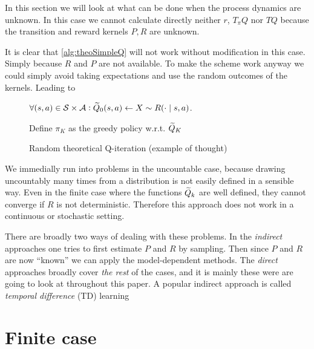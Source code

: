 
In this section we will look at what can be done when the process dynamics
are unknown.
In this case we cannot calculate directly neither $r$, $T_\pi Q$ nor
$TQ$ because the transition and reward kernels $P,R$ are unknown.

It is clear that \cref{alg:theoSimpleQ} will not work without
modification in this case. Simply because $R$ and $P$ are not
available.
To make the scheme work anyway we could simply avoid taking expectations
and use the random outcomes of the kernels.
Leading to

\begin{figure}[H]
\begin{algorithm}[H] %
  \caption{Random theoretical Q-iteration (example of thought)}
$\forall (s, a) \in \mathcal{S} \times \mathcal{A} :
\widetilde{Q}_0(s, a) \leftarrow X \sim R(\cdot \mid s, a)$.

Define $\pi_K$ as the greedy policy w.r.t. $\widetilde{Q}_K$ \\
\label{alg:theoRandomQ}
\end{algorithm}
\end{figure}
We immedially run into problems in the uncountable case, because
drawing uncountably many times from a distribution is not easily
defined in a sensible way.
Even in the finite case where the functions $\widetilde{Q}_k$
are well defined, they cannot converge if $R$ is not deterministic.
Therefore this approach does not work in a continuous or
stochastic setting.

There are broadly two ways of dealing with these problems.
In the \emph{indirect} approaches one tries to first estimate $P$ and $R$
by sampling.
Then since $P$ and $R$ are now ``known'' we can apply the model-dependent
methods.
The \emph{direct} approaches broadly cover \emph{the rest} of the 
cases, and it is mainly these were are going to look at throughout this
paper. A popular indirect approach is called
\emph{temporal difference} (TD) learning 

\section{Finite case}


